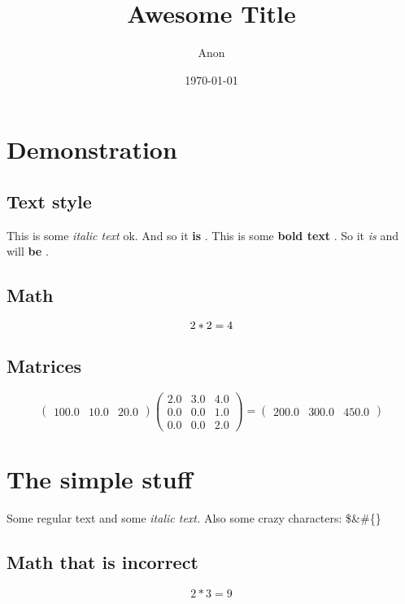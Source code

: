 \documentclass[titlepage]{article}%
\title{Awesome Title}%
\author{Anon}%
\date{\today}%
\begin{document}
%
\normalsize%
\maketitle%
\section{Demonstration}%
\label{sec:Demonstration}%

%
\subsection{Text style}%
\label{subsec:Textstyle}%

%
This is some %
\textit{italic text}%
\hspace{1pt} %
 ok. And so it %
\textbf{is}%
.%
\newline%
%
This is some %
\textbf{bold text}%
. So it %
\textit{is}%
\hspace{1pt} %
 and will %
\textbf{be}%
. %
\subsection{Math}%
\label{subsec:Math}%

%
\[%
2*2 = 4\newline%
%
\]%
\subsection{Matrices}%
\label{subsec:Matrices}%

%
\[%
\begin{pmatrix}%
100.0&10.0&20.0%
\end{pmatrix} \begin{pmatrix}%
2.0&3.0&4.0\\%
0.0&0.0&1.0\\%
0.0&0.0&2.0%
\end{pmatrix} = \begin{pmatrix}%
200.0&300.0&450.0%
\end{pmatrix}%
\]%
\section{The simple stuff}%
\label{sec:Thesimplestuff}%
Some regular text and some %
\textit{italic text.}%
\newline%
Also some crazy characters: \$\&\#\{\}%
\subsection{Math that is incorrect}%
\label{subsec:Maththatisincorrect}%
\[%
2*3 = 9%
\]
\end{document}
